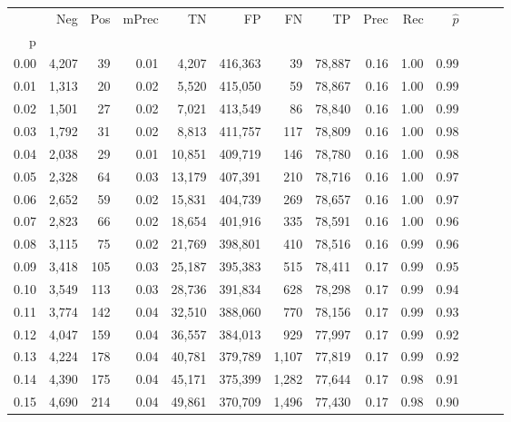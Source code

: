 \begin{tabular}{rrrrrrrrrrrrrr}
\toprule
{} &    Neg &    Pos & mPrec &       TN &       FP &      FN &      TP &  Prec &   Rec & $\hat{p}$ \\
p    &        &        &       &          &          &         &         &       &       &           \\
\midrule
0.00 &  4,207 &     39 &  0.01 &    4,207 &  416,363 &      39 &  78,887 &  0.16 &  1.00 &      0.99 \\
0.01 &  1,313 &     20 &  0.02 &    5,520 &  415,050 &      59 &  78,867 &  0.16 &  1.00 &      0.99 \\
0.02 &  1,501 &     27 &  0.02 &    7,021 &  413,549 &      86 &  78,840 &  0.16 &  1.00 &      0.99 \\
0.03 &  1,792 &     31 &  0.02 &    8,813 &  411,757 &     117 &  78,809 &  0.16 &  1.00 &      0.98 \\
0.04 &  2,038 &     29 &  0.01 &   10,851 &  409,719 &     146 &  78,780 &  0.16 &  1.00 &      0.98 \\
0.05 &  2,328 &     64 &  0.03 &   13,179 &  407,391 &     210 &  78,716 &  0.16 &  1.00 &      0.97 \\
0.06 &  2,652 &     59 &  0.02 &   15,831 &  404,739 &     269 &  78,657 &  0.16 &  1.00 &      0.97 \\
0.07 &  2,823 &     66 &  0.02 &   18,654 &  401,916 &     335 &  78,591 &  0.16 &  1.00 &      0.96 \\
0.08 &  3,115 &     75 &  0.02 &   21,769 &  398,801 &     410 &  78,516 &  0.16 &  0.99 &      0.96 \\
0.09 &  3,418 &    105 &  0.03 &   25,187 &  395,383 &     515 &  78,411 &  0.17 &  0.99 &      0.95 \\
0.10 &  3,549 &    113 &  0.03 &   28,736 &  391,834 &     628 &  78,298 &  0.17 &  0.99 &      0.94 \\
0.11 &  3,774 &    142 &  0.04 &   32,510 &  388,060 &     770 &  78,156 &  0.17 &  0.99 &      0.93 \\
0.12 &  4,047 &    159 &  0.04 &   36,557 &  384,013 &     929 &  77,997 &  0.17 &  0.99 &      0.92 \\
0.13 &  4,224 &    178 &  0.04 &   40,781 &  379,789 &   1,107 &  77,819 &  0.17 &  0.99 &      0.92 \\
0.14 &  4,390 &    175 &  0.04 &   45,171 &  375,399 &   1,282 &  77,644 &  0.17 &  0.98 &      0.91 \\
0.15 &  4,690 &    214 &  0.04 &   49,861 &  370,709 &   1,496 &  77,430 &  0.17 &  0.98 &      0.90 \\

\end{tabular}
